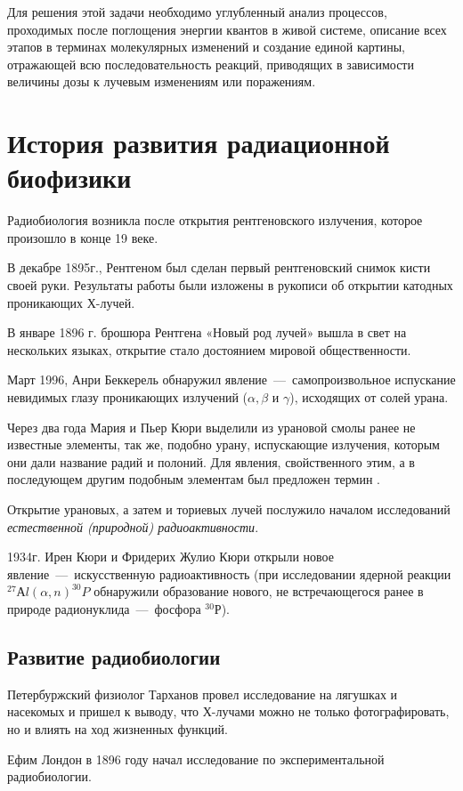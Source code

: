 \documentclass[a4paper, 14pt]{article}
\renewcommand{\emph}[1]{{\color{RedOrange}{\textit{\textbf{#1}}}}}
\begin{document}
Для решения этой задачи необходимо углубленный анализ процессов,
проходимых после поглощения энергии квантов в живой системе, описание всех
этапов в терминах молекулярных изменений и создание единой картины, отражающей
всю последовательность реакций, приводящих в зависимости величины дозы к
лучевым изменениям или поражениям.

\section{История развития радиационной биофизики}
Радиобиология возникла после открытия рентгеновского излучения, которое
произошло в конце 19 веке.

В декабре 1895г., Рентгеном был сделан первый рентгеновский снимок кисти своей руки. Результаты работы были изложены в рукописи об открытии катодных проникающих Х-лучей.

В январе 1896 г. брошюра Рентгена «Новый род лучей» вышла в свет на
нескольких языках, открытие стало достоянием мировой общественности.

Март 1996, Анри Беккерель обнаружил явление~---~самопроизвольное испускание
невидимых глазу проникающих излучений ($\alpha, \beta$ и $\gamma$), исходящих от солей урана.

Через два года Мария и Пьер Кюри выделили из урановой смолы ранее не
известные элементы, так же, подобно урану, испускающие излучения, которым они
дали название радий и полоний. Для явления, свойственного этим, а в последующем
другим подобным элементам был предложен термин \emph{радиоактивность}.

Открытие урановых, а затем и ториевых лучей послужило началом
исследований \textit{естественной (природной) радиоактивности}.

1934г. Ирен Кюри и Фридерих Жулио Кюри открыли новое явление~---~искусственную радиоактивность (при исследовании ядерной реакции $^{27}Аl(\alpha,n)^{30}P$ %
обнаружили образование нового, не встречающегося ранее в природе радионуклида~---~фосфора $^{30}Р$).

\subsection{Развитие радиобиологии}
Петербуржский физиолог Тарханов провел исследование на лягушках и
насекомых и пришел к выводу, что Х-лучами можно не только фотографировать, но и
влиять на ход жизненных функций.

Ефим Лондон в 1896 году начал исследование по экспериментальной
радиобиологии.
\end{document}
